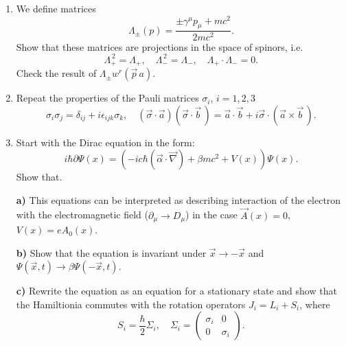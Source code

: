 \documentclass[a4paper,11pt]{article}
\begin{document}
\begin{enumerate}
\item We define matrices
  \begin{equation}
    \label{QM:17}
    \Lambda_{ \pm }( p )
    = \frac{ \pm\gamma^{ \mu } p_{ \mu } + m c^{ 2 } }{ 2 m c^{ 2 } }.
  \end{equation}
  Show that these matrices are projections in the space of spinors,
  i.e.
  \begin{equation}
    \label{QM:18}
    \Lambda_{ + }^{ \, 2 } = \Lambda_{ + }, \quad
    \Lambda_{ - }^{ \, 2 } = \Lambda_{ - }, \quad
    \Lambda_{ + } \cdot \Lambda_{ - } = 0.
  \end{equation}
  Check the result of $\Lambda_{ \pm } w^{ r }( \vec{ p } \,a )$.

\item Repeat the properties of the Pauli matrices $\sigma_{ i }$,
  $i = 1, 2, 3$
  \begin{equation}
    \label{QM:19}
    \sigma_{ i } \sigma_{ j } = \delta_{ i j } + i \epsilon_{ i j k } \sigma_{ k }, \quad
    \left( \vec{ \sigma } \cdot \vec{ a } \right)
    \left( \vec{ \sigma } \cdot \vec{ b } \, \right)
    =
    \vec{ a } \cdot \vec{ b }
    + i \vec{ \sigma } \cdot \left( \vec{ a } \times \vec{ b } \, \right).
  \end{equation}

\item Start with the Dirac equation in the form:
  \begin{equation}
    \label{QM:20}
    i \hbar \partial \Psi( x )
    =
    \left( -ic\hbar \left( \vec{ \alpha } \cdot \vec{ \nabla } \right)
      + \beta m c^{ 2 } + V( x ) \right) \Psi( x ).
  \end{equation}
  Show that.

  \textbf{a)} This equations can be interpreted as describing
  interaction of the electron with the electromagnetic field
  ($\partial_{ \mu } \to D_{ \mu }$) in the case $\vec{ A }( x ) = 0$,
  $V( x ) = e A_{ 0 }( x )$.

  \textbf{b)} Show that the equation is invariant under
  $\vec{ x } \to -\vec{ x }$ and
  $\Psi( \vec{ x }, t ) \to \beta \Psi( -\vec{ x }, t )$.

  \textbf{c)} Rewrite the equation as an equation for a stationary
  state and show that the Hamiltionia commutes with the rotation
  operators $J_{ i } = L_{ i } + S_{ i }$, where
  \begin{equation}
    \label{QM:21}
    S_{ i } = \frac{ \hbar }{ 2 } \Sigma_{ i }, \quad
    \Sigma_{ i }
    =
    \begin{pmatrix}
      \sigma_{ i } & 0 \\
      0 & \sigma_{ i }
    \end{pmatrix}.
  \end{equation}


\end{enumerate}
\end{document}
